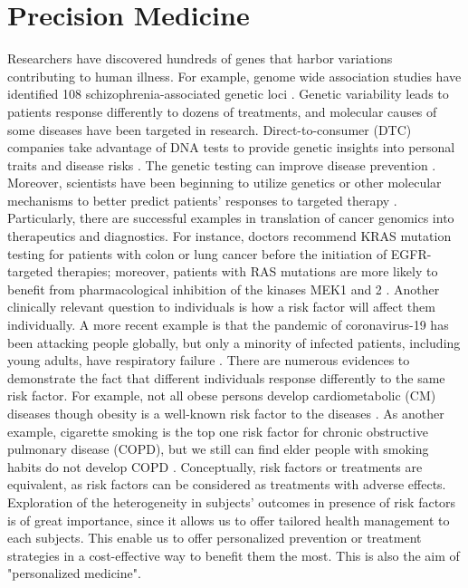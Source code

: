   \section{Precision Medicine}
    Researchers have discovered hundreds of genes that harbor variations contributing to human illness. For example, genome wide association studies have identified 108 schizophrenia-associated genetic loci \cite{schizophrenia2014biological}. Genetic variability leads to patients response differently to dozens of treatments, and molecular causes of some diseases have been targeted in research. Direct-to-consumer (DTC) companies take advantage of DNA tests to provide genetic insights into personal traits and disease risks \cite{ng2009agenda}. The genetic testing can improve disease prevention \cite{heshka2008systematic}. Moreover, scientists have been beginning to utilize genetics or other molecular mechanisms to better predict patients' responses to targeted therapy \cite{hamburg2010path}. Particularly, there are successful examples in translation of cancer genomics into therapeutics and diagnostics. For instance, doctors recommend KRAS mutation testing for patients with colon or lung cancer before the initiation of  EGFR-targeted therapies; moreover, patients with RAS mutations are more likely to benefit from pharmacological inhibition of the kinases MEK1 and 2 \cite{lievre2008kras}. Another clinically relevant question to individuals is how a risk factor will affect them individually. A more recent example is that the pandemic of coronavirus-19 has been attacking people globally, but only a minority of infected patients, including young adults, have respiratory failure \cite{ellinghaus2020genomewide}. There are numerous evidences to demonstrate the fact that different individuals response differently to the same risk factor. For example, not all obese persons develop cardiometabolic (CM) diseases though obesity is a well-known risk factor to the diseases \cite{neeland2018cardiovascular}. As another example, cigarette smoking is the top one risk factor for chronic obstructive pulmonary disease (COPD), but we still can find elder people with smoking habits do not develop COPD \cite{van2015we}. Conceptually, risk factors or treatments are equivalent, as risk factors can be considered as treatments with adverse effects. Exploration of the heterogeneity in subjects' outcomes in presence of risk factors is of great importance, since it allows us to offer tailored health management to each subjects. This enable us to offer personalized prevention or treatment strategies in a cost-effective way to benefit them the most. This is also the aim of "personalized medicine".

